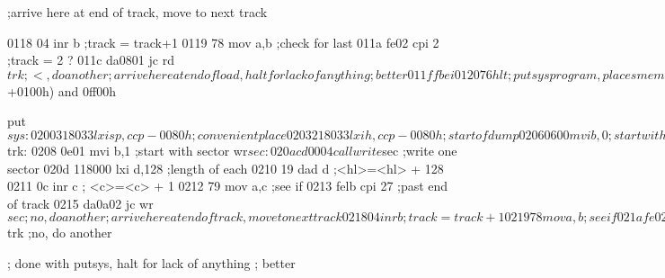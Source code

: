                                ;arrive here at end of track, move to next track

0118 04                                   inr  b            ;track = track+1
0119 78                                   mov  a,b          ;check for last
011a fe02                                 cpi  2            ;track = 2 ?
011c da0801                               jc   rd$trk       ;<, do another

                               ;arrive here at end of load, halt for lack of anything
                               ;better

011f fb                                   ei
0120 76                                   hlt
                               ;          putsys program, places memory image
                               ;          starting at
                               ;          3880h + bias back to tracks 0 and 1
                               ;          start this program at the next page boundary
0200                                      org ($+0100h) and 0ff00h

                               put$sys:
0200 318033                               lxi  sp,ccp-0080h ;convenient place
0203 218033                               lxi  h,ccp-0080h  ;start of dump
0206 0600                                 mvi  b,0          ;start with track
                               wr$trk:
0208 0e01                                 mvi  b,1          ;start with sector
                               wr$sec:
020a cd0004                               call write$sec    ;write one sector
020d 118000                               lxi  d,128        ;length of each
0210 19                                   dad  d            ;<hl>=<hl> + 128
0211 0c                                   inr  c            ; <c>=<c> + 1
0212 79                                   mov  a,c          ;see if
0213 felb                                 cpi  27           ;past end of track
0215 da0a02                               jc   wr$sec       ;no, do another

                               ;arrive here at end of track, move to next track

0218 04                                   inr  b            ;track = track+1
0219 78                                   mov  a,b          ;see if
021a fe02                                 cpi  2            ;last track
021c da0802                               jc   wr$trk       ;no, do another

                               ;          done with putsys, halt for lack of anything
                               ;          better

